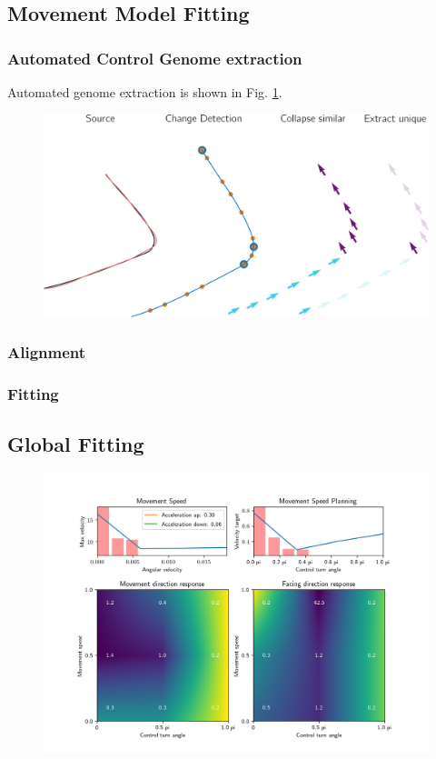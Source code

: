 \subsection{Movement Model Fitting}
\subsubsection{Automated Control Genome extraction}
Automated genome extraction is shown in Fig. \ref{fig:results:genome_extraction}.
\begin{figure}
    \centering
    \includegraphics[width=1.0\columnwidth]{img/genome_extract.png}
    \caption{}
    \label{fig:results:genome_extraction}
\end{figure}
\subsubsection{Alignment}
\subsubsection{Fitting}

\subsection{Global Fitting}

\begin{figure}
    \centering
    \includegraphics[width=1.0\columnwidth]{img/locomotion mode.png}
    \caption{}
    \label{fig:results:locomotion_mode}
\end{figure}



